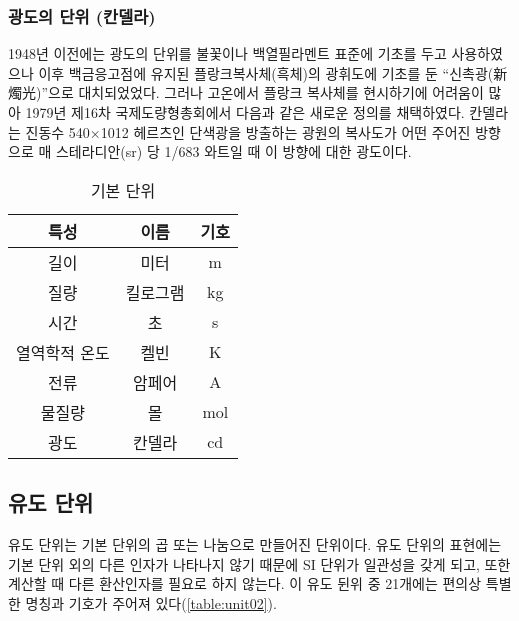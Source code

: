 \subsubsection{광도의 단위 (칸델라)}
1948년 이전에는 광도의 단위를 불꽃이나 백열필라멘트 표준에 기초를 두고 사용하였으나 이후 백금응고점에 유지된 플랑크복사체(흑체)의 광휘도에 기초를 둔 “신촉광(新燭光)”으로 대치되었었다. 그러나 고온에서 플랑크 복사체를 현시하기에 어려움이 많아 1979년 제16차 국제도량형총회에서 다음과 같은 새로운 정의를 채택하였다.
칸델라는 진동수 540×1012 헤르츠인 단색광을 방출하는 광원의 복사도가 어떤 주어진 방향으로 매 스테라디안(sr) 당 1/683 와트일 때 이 방향에 대한 광도이다.

\begin{table}[h]
	\centering
	\caption{기본 단위}
\begin{tabular}{c|c|c}
	\hline 
특성	& 이름 & 기호 \\ 	\hline 
길이	& 미터 & m \\ 	\hline 
질량	& 킬로그램 & kg \\  \hline 
시간	& 초 &  s \\ 	\hline 
열역학적 온도	& 켈빈 & K \\  	\hline 
전류	& 암페어 & A \\  	\hline 
물질량	& 몰  & mol \\  	\hline 
광도	& 칸델라 & cd \\ 	\hline 
\end{tabular} 
		\label{table:unit01}
\end{table}


\subsection{유도 단위}
유도 단위는 기본 단위의 곱 또는 나눔으로 만들어진 단위이다. 유도 단위의 표현에는 기본 단위 외의 다른 인자가 나타나지 않기 때문에 SI 단위가 일관성을 갖게 되고, 또한 계산할 때 다른 환산인자를 필요로 하지 않는다. 이 유도 뒨위 중 21개에는 편의상 특별한 명칭과 기호가 주어져 있다(\ref{table:unit02}). 

